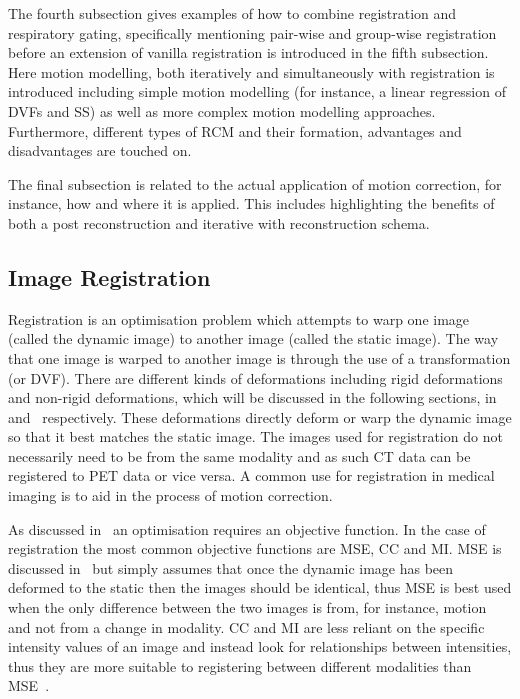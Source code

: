         The fourth subsection gives examples of how to combine registration and respiratory gating, specifically mentioning pair-wise and group-wise registration before an extension of vanilla registration is introduced in the fifth subsection. Here motion modelling, both iteratively and simultaneously with registration is introduced including simple motion modelling (for instance, a linear regression of \glspl{DVF} and \gls{SS}) as well as more complex motion modelling approaches. Furthermore, different types of \gls{RCM} and their formation, advantages and disadvantages are touched on.
        
        The final subsection is related to the actual application of motion correction, for instance, how and where it is applied. This includes highlighting the benefits of both a post reconstruction and iterative with reconstruction schema.
    
        \subsection{Image Registration} \label{sec:image_registration}
            Registration is an optimisation problem which attempts to warp one image (called the dynamic image) to another image (called the static image). The way that one image is warped to another image is through the use of a transformation (or \gls{DVF}). There are  different kinds of deformations including rigid deformations and non-rigid deformations, which will be discussed in the following sections, in~ and~ respectively. These deformations directly deform or warp the dynamic image so that it best matches the static image. %
            The images used for registration do not necessarily need to be from the same modality and as such \gls{CT} data can be registered to \gls{PET} data or vice versa. A common use for registration in medical imaging is to aid in the process of motion correction.
            
            As discussed in~ an optimisation requires an objective function. In the case of registration the most common objective functions are \gls{MSE}, \gls{CC} and \gls{MI}. \gls{MSE} is discussed in~ but simply assumes that once the dynamic image has been deformed to the static then the images should be identical, thus \gls{MSE} is best used when the only difference between the two images is from, for instance, motion and not from a change in modality. \gls{CC} and \gls{MI} are less reliant on the specific intensity values of an image and instead look for relationships between intensities, thus they are more suitable to registering between different modalities than \gls{MSE}~\parencite{Hill2001, Oliveira2014}.
            
